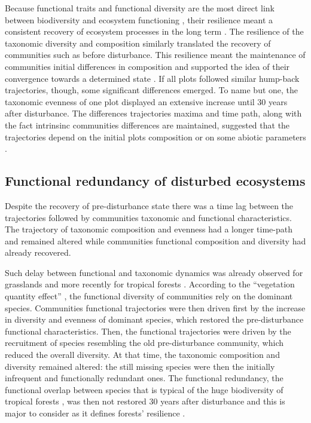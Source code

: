 \documentclass[fleqn,10pt]{ArtEcoFoG} %
\theoremstyle{definition}
\theoremstyle{definition}
\theoremstyle{definition}
\theoremstyle{remark}
\begin{document}
Because functional traits and functional diversity are the most direct
link between biodiversity and ecosystem functioning \citep{Diaz2005},
their resilience meant a consistent recovery of ecosystem processes in
the long term \citep{Guariguata2001}. The resilience of the taxonomic
diversity and composition similarly translated the recovery of
communities such as before disturbance. This resilience meant the
maintenance of communities initial differences in composition and
supported the idea of their convergence towards a determined state
\citep{Hubbell1999, Molino2001, Baraloto2012a}. If all plots followed
similar hump-back trajectories, though, some significant differences
emerged. To name but one, the taxonomic evenness of one plot displayed
an extensive increase until 30 years after disturbance. The differences
trajectories maxima and time path, along with the fact intrinsinc
communities differences are maintained, suggested that the trajectories
depend on the initial plots composition or on some abiotic parameters
\citep{Anderson2007}.

\subsection{Functional redundancy of disturbed
ecosystems}\label{functional-redundancy-of-disturbed-ecosystems}

Despite the recovery of pre-disturbance state there was a time lag
between the trajectories followed by communities taxonomic and
functional characteristics. The trajectory of taxonomic composition and
evenness had a longer time-path and remained altered while communities
functional composition and diversity had already recovered.

Such delay between functional and taxonomic dynamics was already
observed for grasslands \citep{Tilman1997, Mouillot2011} and more
recently for tropical forests \citep{Lohbeck2015, Guariguata2001}.
According to the ``vegetation quantity effect'' \citep{Grime1998}, the
functional diversity of communities rely on the dominant species.
Communities functional trajectories were then driven first by the
increase in diversity and evenness of dominant species, which restored
the pre-disturbance functional characteristics. Then, the functional
trajectories were driven by the recruitment of species resembling the
old pre-disturbance community, which reduced the overall diversity. At
that time, the taxonomic composition and diversity remained altered: the
still missing species were then the initially infrequent and
functionally redundant ones. The functional redundancy, the functional
overlap between species that is typical of the huge biodiversity of
tropical forests \citep{Bellwood2006}, was then not restored 30 years
after disturbance and this is major to consider as it defines forests'
resilience \citep{Trenbath1999, Elmqvist2003, Diaz2005}.
\end{document}

